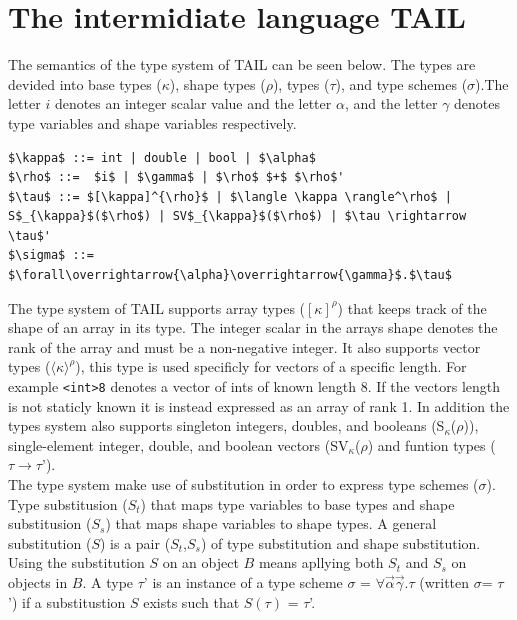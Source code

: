 \documentclass[11pt]{article}
\begin{document}
\section{The intermidiate language TAIL}

The semantics of the type system of TAIL can be seen below. The types are devided into base types ($\kappa$), shape types ($\rho$), types ($\tau$), and type schemes ($\sigma$).The letter $i$ denotes an integer scalar value and the letter $\alpha$, and the letter $\gamma$ denotes type variables and shape variables respectively.
\begin{lstlisting}[numbers=none,frame=none]
$\kappa$ ::= int | double | bool | $\alpha$
$\rho$ ::=  $i$ | $\gamma$ | $\rho$ $+$ $\rho$'
$\tau$ ::= $[\kappa]^{\rho}$ | $\langle \kappa \rangle^\rho$ | S$_{\kappa}$($\rho$) | SV$_{\kappa}$($\rho$) | $\tau \rightarrow \tau$'
$\sigma$ ::= $\forall\overrightarrow{\alpha}\overrightarrow{\gamma}$.$\tau$
\end{lstlisting}
The type system of TAIL supports array types ($[\kappa]^{\rho}$) that keeps track of the shape of an array in its type.
The integer scalar in the arrays shape denotes the rank of the array and must be a non-negative integer. 
It also supports vector types ($\langle \kappa \rangle^\rho$), this type is used specificly for vectors of a specific length. For example {\tt <int>8} denotes a vector of ints of known length 8. If the vectors length is not staticly known it is instead expressed as an array of rank 1. 
In addition the types system also supports singleton integers, doubles, and booleans (S$_{\kappa}$($\rho$)), single-element integer, double, and boolean vectors (SV$_{\kappa}$($\rho$) and funtion types ($\tau \rightarrow \tau$'). \\

The type system make use of substitution in order to express type schemes ($\sigma$). Type substitusion ($S_t$) that maps type variables to base types and shape substitusion ($S_s$) that maps shape variables to shape types. A general substitution ($S$) is a pair ($S_t$,$S_s$) of type substitution and shape substitution. Using the substitution $S$ on an object $B$ means apllying 
both $S_t$ and $S_s$ on objects in $B$. A type $\tau$' is an instance of a type scheme $\sigma$ = $\forall\overrightarrow{\alpha}\overrightarrow{\gamma}$.$\tau$ (written $\sigma$= $\tau$') if a substitustion $S$ exists such that $S(\tau)$ = $\tau$'. \\
\end{document}
